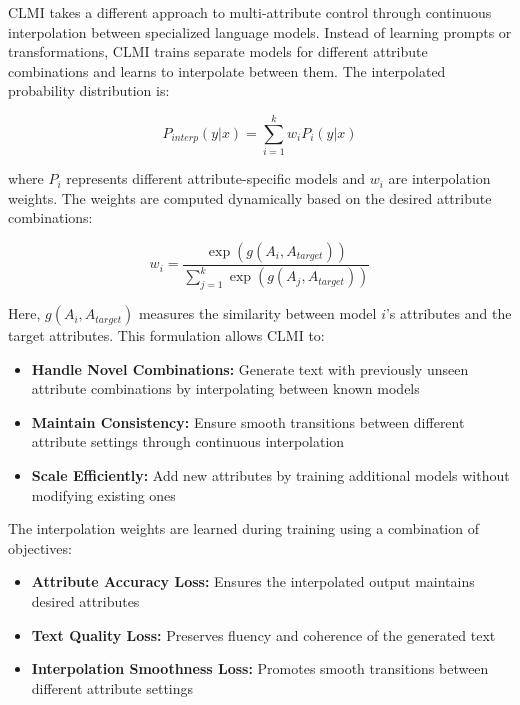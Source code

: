 CLMI takes a different approach to multi-attribute control through continuous interpolation between specialized language models. Instead of learning prompts or transformations, CLMI trains separate models for different attribute combinations and learns to interpolate between them. The interpolated probability distribution is:

\begin{equation}
    P_{interp}(y|x) = \sum_{i=1}^k w_i P_i(y|x)
\end{equation}

where $P_i$ represents different attribute-specific models and $w_i$ are interpolation weights. The weights are computed dynamically based on the desired attribute combinations:

\begin{equation}
    w_i = \frac{\exp(g(A_i, A_{target}))}{\sum_{j=1}^k \exp(g(A_j, A_{target}))}
\end{equation}

Here, $g(A_i, A_{target})$ measures the similarity between model $i$'s attributes and the target attributes. This formulation allows CLMI to:

\begin{itemize}
    \item \textbf{Handle Novel Combinations:} Generate text with previously unseen attribute combinations by interpolating between known models
    
    \item \textbf{Maintain Consistency:} Ensure smooth transitions between different attribute settings through continuous interpolation
    
    \item \textbf{Scale Efficiently:} Add new attributes by training additional models without modifying existing ones
\end{itemize}

The interpolation weights are learned during training using a combination of objectives:

\begin{itemize}
    \item \textbf{Attribute Accuracy Loss:} Ensures the interpolated output maintains desired attributes
    
    \item \textbf{Text Quality Loss:} Preserves fluency and coherence of the generated text
    
    \item \textbf{Interpolation Smoothness Loss:} Promotes smooth transitions between different attribute settings
\end{itemize}

